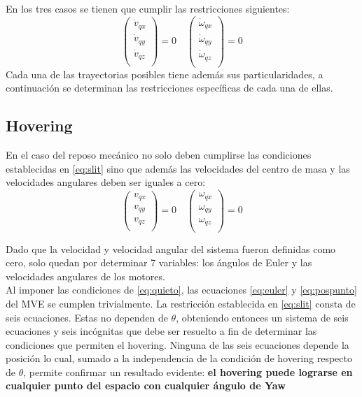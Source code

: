 \documentclass[main]{subfiles}
\begin{document}
En los tres casos se tienen que cumplir las restricciones siguientes:
\begin{equation}
\label{eq:slit}
\left(\begin{array}{c}
\dot{v}_{qx}\\
\dot{v}_{qy}\\
\dot{v}_{qz}\\
\end{array}\right)=0 \quad 
\left(\begin{array}{c}
\dot{\omega}_{qx}\\
\dot{\omega}_{qy}\\
\dot{\omega}_{qz}\\
\end{array}\right)=0
\end{equation}
Cada una de las trayectorias posibles tiene adem\'as sus particularidades, a continuaci\'on se determinan las restricciones espec\'ificas de cada una de ellas.

\subsection{Hovering}
En el caso del reposo mec\'anico no solo deben cumplirse las condiciones establecidas en \ref{eq:slit} sino que adem\'as las velocidades del centro de masa y las velocidades angulares deben ser iguales a cero:
\begin{equation}
\label{eq:quieto}
\left(\begin{array}{c}
v_{qx}\\
v_{qy}\\
v_{qz}\\
\end{array}\right)=0 \quad
\left(\begin{array}{c}
\omega_{qx}\\
\omega_{qy}\\
\omega_{qz}\\
\end{array}\right)=0
\end{equation}

Dado que la velocidad y velocidad angular del sistema fueron definidas como cero, solo quedan por determinar 7 variables: los \'angulos de Euler y las velocidades angulares de los motores. \\

Al imponer las condiciones de \ref{eq:quieto}, las ecuaciones \ref{eq:euler} y \ref{eq:pospunto} del MVE se cumplen trivialmente. La restricci\'on establecida en \ref{eq:slit} consta de seis ecuaciones. Estas no dependen de $\theta$, obteniendo entonces un sistema de seis ecuaciones y seis inc\'ognitas que debe ser resuelto a fin de determinar las condiciones que permiten el hovering. Ninguna de las seis ecuaciones depende la posici\'on  lo cual, sumado a la independencia de la condici\'on de hovering respecto de $\theta$, permite confirmar un resultado evidente: \textbf{el hovering puede lograrse en cualquier punto del espacio con cualquier \'angulo de Yaw}\\
\end{document}

